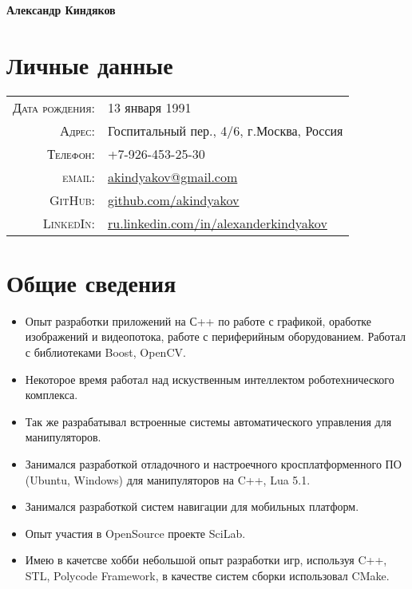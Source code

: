 \documentclass[a4paper, 11pt]{article}
\begin{document}
{\LARGE\textbf{Александр Киндяков}}

\section{Личные данные}
\begin{tabular}{rl}
    \textsc{Дата рождения:} & 13 января 1991 \\
    \textsc{Адрес:}         & Госпитальный пер., 4/6, г.Москва, Россия \\
    \textsc{Телефон:}       & +7-926-453-25-30 \\
    \textsc{email:}         & \href{mailto:akindyakov@gmail.com}{akindyakov@gmail.com} \\
    \textsc{GitHub:}        & \href{https://github.com/akindyakov}{github.com/akindyakov} \\
    \textsc{LinkedIn:}      & \href{http://ru.linkedin.com/in/alexanderkindyakov}{ru.linkedin.com/in/alexanderkindyakov} \\
\end{tabular}

\section{Общие сведения}
\begin{itemize}
    \item Опыт разработки приложений на С++ по работе с графикой, оработке
    изображений и видеопотока, работе с периферийным оборудованием. 
    Работал с библиотеками Boost, OpenCV. 
    \item Некоторое время работал над искуственным интеллектом роботехнического комплекса.
    \item Так же разрабатывал встроенные системы автоматического управления для
    манипуляторов. 
    \item Занимался разработкой отладочного и настроечного
    кросплатформенного ПО (Ubuntu, Windows) для манипуляторов 
    на C++, Lua 5.1. 
    \item Занимался разработкой систем навигации для мобильных платформ.
    \item Опыт участия в OpenSource проекте SciLab.
    \item Имею в качетсве хобби небольшой опыт разработки игр, используя C++, STL,
    Polycode Framework, в качестве систем сборки использовал CMake.
\end{itemize}
\end{document}
